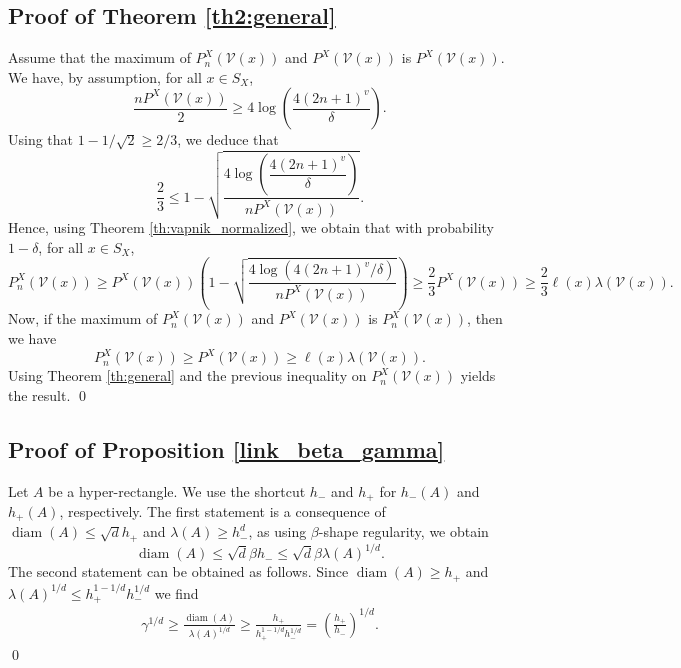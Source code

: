 \documentclass[paper=a4, fontsize=11pt]{scrartcl}
\newcommand{\diam}{\operatorname{diam}}
\newcommand{\PP}{\mathbb{P}}
\begin{document}
\subsection*{Proof of Theorem \ref{th2:general}}

Assume that the maximum of $P_n^X(\mathcal V(x))$ and $P^X(\mathcal V(x))$ is $P^X(\mathcal V(x)).$
We have, by assumption, for all $x\in S_X$,
$$ \frac{ n     P^X(\mathcal V(x)) }{2}  \geq 4 \log\left(\dfrac{4 (2n+1) ^v }{\delta} \right). $$
 Using that $1-1/\sqrt 2 \geq  2/3$, we deduce that
$$ \frac 2 3 \leq 1 -   \sqrt{ \frac{4 \log\left(\dfrac{4 (2n+1) ^v }{\delta} \right) }{n     P^X(\mathcal V(x))} }.$$
Hence, using Theorem \ref{th:vapnik_normalized}, we obtain that with probability $1-\delta$, for all $x\in S_X$,
$$ P_n^X(\mathcal V(x)) \geq P^X(\mathcal V(x)) \left(1-\sqrt { \frac{4 \log( 4 (2n+1) ^v / \delta) }{ n P^X (\mathcal V(x))} } \right)\geq \frac 2 3P^X (\mathcal V(x))  \geq \frac 2 3\ell(x) \lambda (\mathcal V(x) ).$$
Now, if the maximum of $P_n^X(\mathcal V(x))$ and $P^X(\mathcal V(x))$ is $P_n^X(\mathcal V(x))$, then we have
$$ P_n^X(\mathcal V(x) ) \geq P^X(\mathcal V(x) )  \geq \ell(x) \lambda (\mathcal V(x) ).$$ %
Using Theorem \ref{th:general} and the previous inequality on $ P_n^X(\mathcal V(x) )$ yields the result.
\qed

\subsection*{Proof of Proposition \ref{link_beta_gamma}}

Let $A$ be a hyper-rectangle. We use the shortcut $h_- $ and $h_+$ for $h_- (A) $ and $ h_+(A)$, respectively. The first statement is a consequence of 
$ \diam (A) \leq \sqrt{d} h_+ $ 
and 
$ \lambda (A) \geq h_- ^d $, as using $\beta $-shape regularity, we obtain
$$ \diam (A)\leq \sqrt{d} \beta h_- \leq \sqrt{d} \beta \lambda (A) ^{1/d}.$$
    The second statement can be obtained as follows. Since $\diam (A) \geq h_ +$ and $ \lambda (A)^{1/d} \leq h_+ ^{1 -1/d}  h_- ^{1/d}$ we find
 \begin{align*}
      \gamma^{1/d} \geq \frac{ \diam (A)}{ \lambda (A)^{1/d} } \geq \frac{ h_ + }{  h_+ ^{1 -1/d}  h_- ^{1/d} } = \left(\frac{  h_ +}{   h_-  } \right)^{1/d}.
\end{align*}\qed
\end{document}
